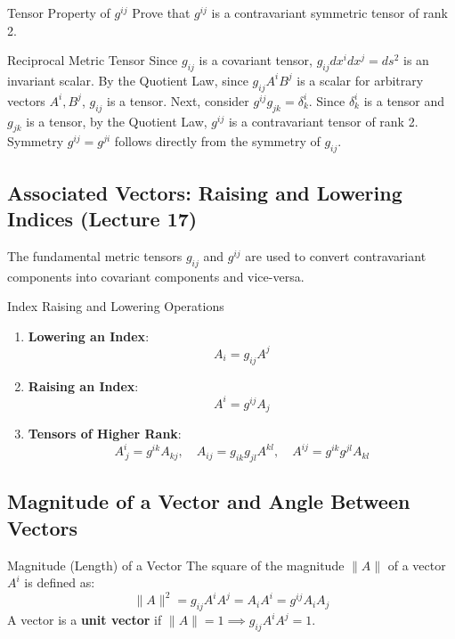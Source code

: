\documentclass[11pt,a4paper]{article}
\begin{document}
\begin{theorembox}{Tensor Property of $g^{ij}$}
Prove that $g^{ij}$ is a contravariant symmetric tensor of rank 2.
\end{theorembox}
\begin{proofbox}{Reciprocal Metric Tensor}
Since $g_{ij}$ is a covariant tensor, $g_{ij} dx^i dx^j = ds^2$ is an invariant scalar. By the Quotient Law, since $g_{ij} A^i B^j$ is a scalar for arbitrary vectors $A^i, B^j$, $g_{ij}$ is a tensor.
Next, consider $g^{ij} g_{jk} = \delta^i_k$. Since $\delta^i_k$ is a tensor and $g_{jk}$ is a tensor, by the Quotient Law, $g^{ij}$ is a contravariant tensor of rank 2. Symmetry $g^{ij} = g^{ji}$ follows directly from the symmetry of $g_{ij}$.
\end{proofbox}

\subsection{Associated Vectors: Raising and Lowering Indices (Lecture 17)}
The fundamental metric tensors $g_{ij}$ and $g^{ij}$ are used to convert contravariant components into covariant components and vice-versa.

\begin{importantbox}{Index Raising and Lowering Operations}
\begin{enumerate}
    \item \textbf{Lowering an Index}:
    \[
    A_i = g_{ij} A^j
    \]
    \item \textbf{Raising an Index}:
    \[
    A^i = g^{ij} A_j
    \]
    \item \textbf{Tensors of Higher Rank}:
    \[
    A^i_{\, j} = g^{ik} A_{kj}, \quad A_{ij} = g_{ik} g_{jl} A^{kl}, \quad A^{ij} = g^{ik} g^{jl} A_{kl}
    \]
\end{enumerate}
\end{importantbox}

\subsection{Magnitude of a Vector and Angle Between Vectors}
\begin{definitionbox}{Magnitude (Length) of a Vector}
The square of the magnitude $\|A\|$ of a vector $A^i$ is defined as:
\[
\|A\|^2 = g_{ij} A^i A^j = A_i A^i = g^{ij} A_i A_j
\]
A vector is a \textbf{unit vector} if $\|A\| = 1 \implies g_{ij} A^i A^j = 1$.
\end{definitionbox}
\end{document}
